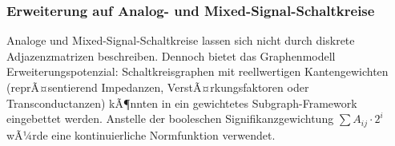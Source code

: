 ﻿\documentclass[a4paper,12pt]{article}
\theoremstyle{definition}
\begin{document}
\subsubsection{Erweiterung auf Analog- und Mixed-Signal-Schaltkreise}

Analoge und Mixed-Signal-Schaltkreise lassen sich nicht durch diskrete
Adjazenzmatrizen beschreiben. Dennoch bietet das Graphenmodell
Erweiterungspotenzial: Schaltkreisgraphen mit reellwertigen
Kantengewichten (reprÃ¤sentierend Impedanzen, VerstÃ¤rkungsfaktoren
oder Transconductanzen) kÃ¶nnten in ein gewichtetes Subgraph-Framework
eingebettet werden. Anstelle der booleschen Signifikanzgewichtung
$\sum A_{ij} \cdot 2^i$ wÃ¼rde eine kontinuierliche
Norm\-funktion verwendet.

\end{document}
